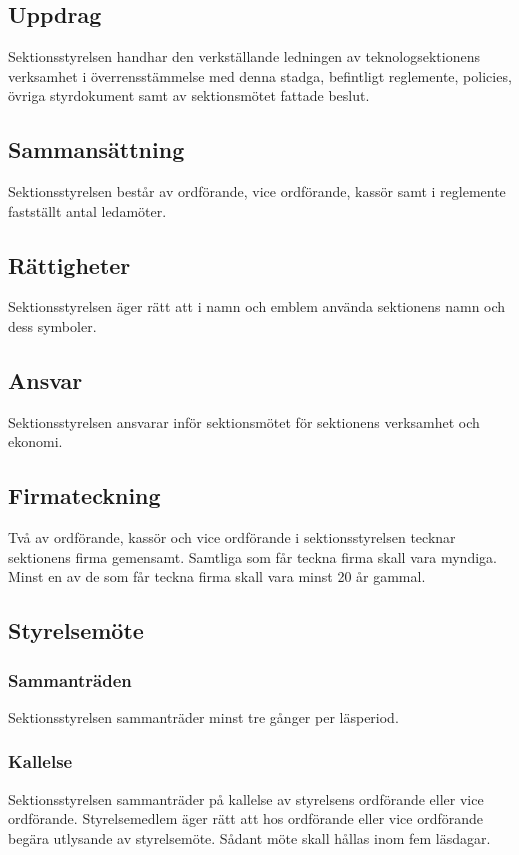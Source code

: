 \section{\STYRITFULL}

\subsection{Uppdrag}
Sektionsstyrelsen handhar den verkställande ledningen av teknologsektionens verksamhet i överrensstämmelse med denna stadga, befintligt reglemente, policies, övriga styrdokument samt av sektionsmötet fattade beslut.

\subsection{Sammansättning}
Sektionsstyrelsen består av ordförande, vice ordförande, kassör samt i reglemente fastställt antal ledamöter.

\subsection{Rättigheter}
Sektionsstyrelsen äger rätt att i namn och emblem använda sektionens namn och dess symboler.

\subsection{Ansvar}
Sektionsstyrelsen ansvarar inför sektionsmötet för sektionens verksamhet och ekonomi.

\subsection{Firmateckning}
Två av ordförande, kassör och vice ordförande i sektionsstyrelsen tecknar sektionens firma gemensamt. Samtliga som får teckna firma skall vara myndiga. Minst en av de som får teckna firma skall vara minst 20 år gammal.

\subsection{Styrelsemöte}

\subsubsection{Sammanträden}
Sektionsstyrelsen sammanträder minst tre gånger per läsperiod.

\subsubsection{Kallelse}
Sektionsstyrelsen sammanträder på kallelse av styrelsens ordförande eller vice ordförande. Styrelsemedlem äger rätt att hos ordförande eller vice ordförande begära utlysande av styrelsemöte. Sådant möte skall hållas inom fem läsdagar.

